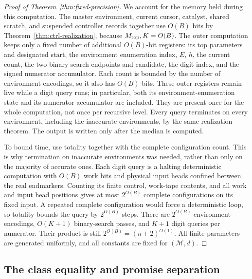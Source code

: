 \begin{proof}[Proof of Theorem~\ref{thm:fixed-precision}]
We account for the memory held during this computation. The master
environment, current cursor, catalyst, shared scratch, and suspended
controller records together use $O(B)$ bits by
Theorem~\ref{thm:ctrl-realization}, because $M_{\rm top},K=O(B)$.
The outer computation keeps only a fixed number of additional
$O(B)$-bit registers: its top parameters and designated start,
the environment enumeration index, $E$, $h$, the current count,
the two binary-search endpoints and candidate, the digit index,
and the signed numerator accumulator. Each count is bounded by the
number of environment encodings, so it also has $O(B)$ bits.
These outer registers remain live while a digit query runs; in
particular, both its environment-enumeration state and its numerator
accumulator are included. They are present once for the whole
computation, not once per recursive level. Every query terminates on every environment,
including the inaccurate environments, by the same realization
theorem. The output is written only after the median is computed.

To bound time, use totality together with the complete configuration count. This is why termination on inaccurate environments was needed, rather than only on the majority of accurate ones. Each digit query is a halting deterministic computation with $O(B)$
work bits and physical input heads confined between the real endmarkers.
Counting its finite control, work-tape contents, and all work and input
head positions gives at most $2^{O(B)}$ complete configurations on its
fixed input. A repeated complete configuration would
force a deterministic loop, so totality bounds the query by
$2^{O(B)}$ steps. There are
$2^{O(B)}$ environment encodings, $O(K+1)$ binary-search passes,
and $K+1$ digit queries per numerator. Their product is still
$2^{O(B)}=(n+2)^{O(1)}$. All finite parameters are generated
uniformly, and all constants are fixed for $(\mathcal M,d)$.
\end{proof}

\subsection{The class equality and promise separation}


